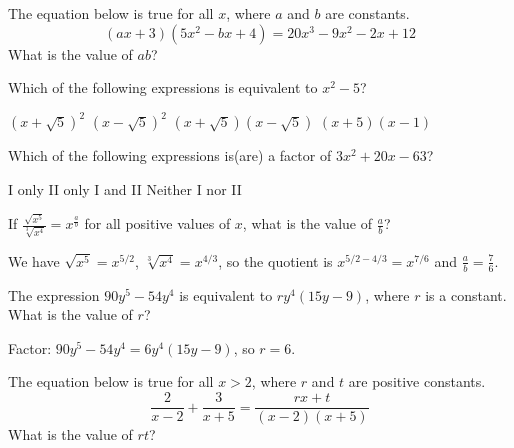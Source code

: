 \question[1]
The equation below is true for all $x$, where $a$ and $b$ are constants.
\[
  (a x+3)\left(5 x^{2}-b x+4\right)=20 x^{3}-9 x^{2}-2 x+12
\]
What is the value of $a b$?
\begin{choices}
\end{choices}

\question[1]
Which of the following expressions is equivalent to $x^{2}-5$?
\begin{choices}
  \choice $(x+\sqrt{5})^{2}$
  \choice $(x-\sqrt{5})^{2}$
  \CorrectChoice $(x+\sqrt{5})(x-\sqrt{5})$
  \choice $(x+5)(x-1)$
\end{choices}



\newpage




\question[1]
Which of the following expressions is(are) a factor of $3 x^{2}+20 x-63$?
\begin{choices}
  \choice I only
  \CorrectChoice II only
  \choice I and II
  \choice Neither I nor II
\end{choices}

\question[1]
If $\frac{\sqrt{x^{5}}}{\sqrt[3]{x^{4}}}=x^{\frac{a}{b}}$ for all positive values of $x$, what is the value of $\frac{a}{b}$?
\begin{solutionorbox}
We have $\sqrt{x^{5}}=x^{5/2}$, $\sqrt[3]{x^{4}}=x^{4/3}$, so the quotient is $x^{5/2-4/3}=x^{7/6}$ and $\frac{a}{b}=\frac{7}{6}$.
\end{solutionorbox}

\question[1]
The expression $90 y^{5}-54 y^{4}$ is equivalent to $r y^{4}(15 y-9)$, where $r$ is a constant. What is the value of $r$?
\begin{solutionorbox}
Factor: $90 y^{5}-54 y^{4}=6 y^{4}(15 y-9)$, so $r=6$.
\end{solutionorbox}



\newpage



\question[1]
The equation below is true for all $x>2$, where $r$ and $t$ are positive constants.
\[
  \frac{2}{x-2}+\frac{3}{x+5}=\frac{r x+t}{(x-2)(x+5)}
\]
What is the value of $r t$?
\begin{choices}
\end{choices}

